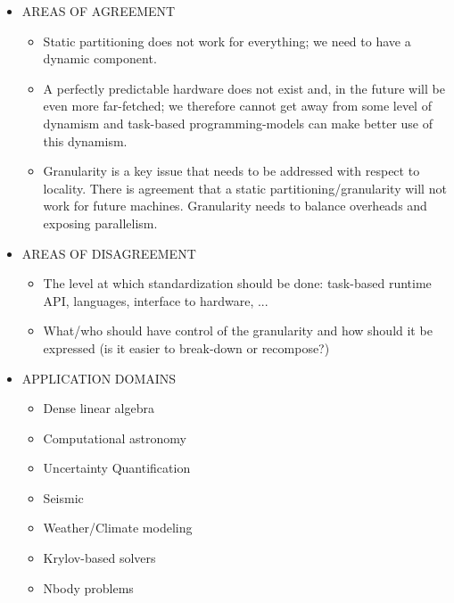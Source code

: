 \begin{itemize}
			
			
	\item AREAS OF AGREEMENT
		  \begin{itemize}
		  \item Static partitioning does not work for everything; we need to
		      have a dynamic component.
		  \item A perfectly predictable hardware does not exist and, in the
		      future will be even more far-fetched; we therefore cannot get
		      away from some level of dynamism and task-based
		      programming-models can make better use of this dynamism.
		  \item Granularity is a key issue that needs to be addressed with
		      respect to locality. There is agreement that a static
		      partitioning/granularity will not work for future
		      machines. Granularity needs to balance overheads and exposing
		      parallelism.
		  \end{itemize}
	
	
	
	\item AREAS OF DISAGREEMENT
		  \begin{itemize}
		  \item The level at which standardization should be done: task-based
		      runtime API, languages, interface to hardware, ...
		  \item What/who should have control of the granularity and how should
		      it be expressed (is it easier to break-down or recompose?)
		  \end{itemize}



	\item APPLICATION DOMAINS
		\begin{itemize}
			\item Dense linear algebra
			\item Computational astronomy
			\item Uncertainty Quantification
			\item Seismic
			\item Weather/Climate modeling
			\item Krylov-based solvers
			\item Nbody problems
		\end{itemize}

\end{itemize}
